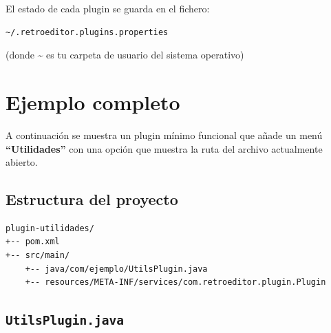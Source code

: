 \documentclass[../../main.tex]{subfiles}
\begin{document}
El estado de cada plugin se guarda en el fichero:

\begin{lstlisting}
~/.retroeditor.plugins.properties
\end{lstlisting}

(donde \textasciitilde{} es tu carpeta de usuario del sistema operativo)

\clearpage

\section{Ejemplo completo}

A continuación se muestra un plugin mínimo funcional que añade un menú \textbf{``Utilidades''} con una opción que muestra la ruta del archivo actualmente abierto.

\subsection{Estructura del proyecto}

\begin{lstlisting}[language=bash]
plugin-utilidades/
+-- pom.xml
+-- src/main/
    +-- java/com/ejemplo/UtilsPlugin.java
    +-- resources/META-INF/services/com.retroeditor.plugin.Plugin
\end{lstlisting}

\subsection{\texttt{UtilsPlugin.java}}
\end{document}

